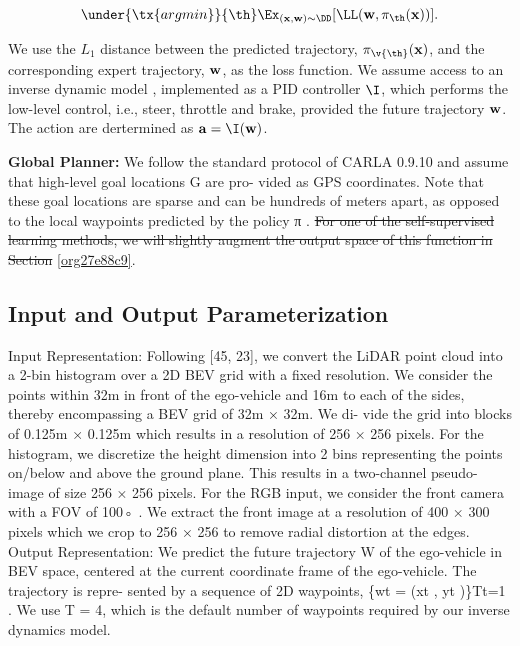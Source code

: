 \documentclass[letterpaper, 12pt]{article}
\theoremstyle{definition}
\theoremstyle{definition}
\theoremstyle{definition}
\theoremstyle{definition}
\theoremstyle{definition}
\begin{document}
\[\under{\tx{argmin }}{{\th}} \Ex_{(\bf x,\bf w)\sim \DD} [\LL(\bf
   w,\pi_{\th}(\bf x))].\]

We use the \(L_{1}\) distance between the predicted trajectory,
\(\pi_{\v{\th}}(\bf x)\), and the corresponding expert trajectory, \(\bf w\),
as the loss function. We assume access to an inverse dynamic model
\cite{10.2307/j.ctt183ph6v}, implemented as a PID controller \(\I\), which
performs the low-level control, i.e., steer, throttle and brake, provided the
future trajectory \(\bf w\). The action are dertermined as \(\bf a=\I(\bf w)\).

\textbf{Global Planner:} We follow the standard protocol of CARLA 0.9.10 and assume that
high-level goal locations G are pro- vided as GPS coordinates. Note that
these goal locations are sparse and can be hundreds of meters apart, as
opposed to the local waypoints predicted by the policy π .
\sout{For one of the self-supervised learning methods, we will slightly augment
the output space of this function in Section} \ref{org27e88c9}.

\subsection{Input and Output Parameterization}
\label{sec:orgfe3415d}
Input Representation: Following [45, 23], we convert the
LiDAR point cloud into a 2-bin histogram over a 2D BEV
grid with a fixed resolution. We consider the points within
32m in front of the ego-vehicle and 16m to each of the sides,
thereby encompassing a BEV grid of 32m × 32m. We di-
vide the grid into blocks of 0.125m × 0.125m which results
in a resolution of 256 × 256 pixels. For the histogram, we
discretize the height dimension into 2 bins representing the
points on/below and above the ground plane. This results in
a two-channel pseudo-image of size 256 × 256 pixels. For
the RGB input, we consider the front camera with a FOV
of 100◦ . We extract the front image at a resolution of 400
× 300 pixels which we crop to 256 × 256 to remove radial
distortion at the edges.
Output Representation: We predict the future trajectory
W of the ego-vehicle in BEV space, centered at the current
coordinate frame of the ego-vehicle. The trajectory is repre-
sented by a sequence of 2D waypoints, \{wt = (xt , yt )\}Tt=1 .
We use T = 4, which is the default number of waypoints
required by our inverse dynamics model.
\end{document}
